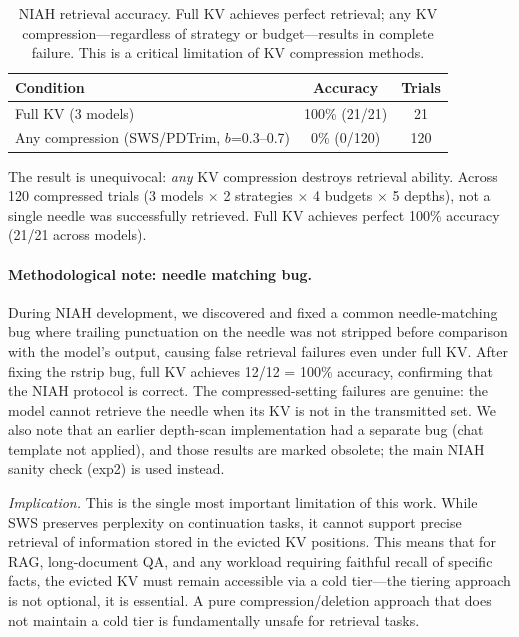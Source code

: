 \documentclass[11pt]{article}
\newcommand{\sws}{SWS}
\newcommand{\pct}{\%}
\theoremstyle{definition}
\theoremstyle{plain}
\begin{document}
\begin{table}[t]
\centering
\caption{NIAH retrieval accuracy.  Full KV achieves perfect retrieval; any KV compression---regardless of strategy or budget---results in complete failure.  This is a critical limitation of KV compression methods.}
\label{tab:niah}
\small
\begin{tabular}{lcc}
\toprule
Condition & Accuracy & Trials \\
\midrule
Full KV (3 models) & 100\pct{} (21/21) & 21 \\
Any compression (SWS/PDTrim, $b$=0.3--0.7) & 0\pct{} (0/120) & 120 \\
\bottomrule
\end{tabular}
\end{table}

The result is unequivocal: \emph{any} KV compression destroys retrieval ability.  Across 120 compressed trials (3 models $\times$ 2 strategies $\times$ 4 budgets $\times$ 5 depths), not a single needle was successfully retrieved.  Full KV achieves perfect 100\pct{} accuracy (21/21 across models).

\paragraph{Methodological note: needle matching bug.}  During NIAH development, we discovered and fixed a common needle-matching bug where trailing punctuation on the needle was not stripped before comparison with the model's output, causing false retrieval failures even under full KV.  After fixing the rstrip bug, full KV achieves 12/12 = 100\pct{} accuracy, confirming that the NIAH protocol is correct.  The compressed-setting failures are genuine: the model cannot retrieve the needle when its KV is not in the transmitted set.  We also note that an earlier depth-scan implementation had a separate bug (chat template not applied), and those results are marked obsolete; the main NIAH sanity check (exp2) is used instead.

\emph{Implication.}  This is the single most important limitation of this work.  While \sws{} preserves perplexity on continuation tasks, it cannot support precise retrieval of information stored in the evicted KV positions.  This means that for RAG, long-document QA, and any workload requiring faithful recall of specific facts, the evicted KV must remain accessible via a cold tier---the tiering approach is not optional, it is essential.  A pure compression/deletion approach that does not maintain a cold tier is fundamentally unsafe for retrieval tasks.
\end{document}
